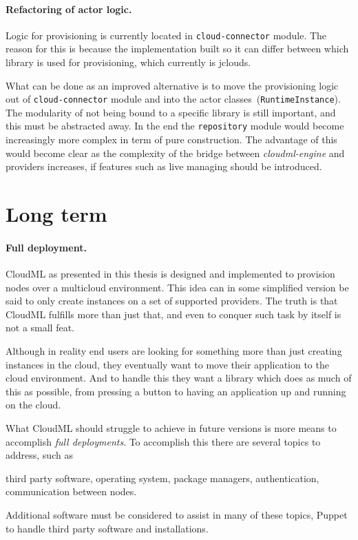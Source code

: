 \paragraph{Refactoring of actor logic.}

Logic for provisioning is currently located in \texttt{cloud-connector} module.
The reason for this is because the implementation built so it can differ between which library is used for provisioning, 
which currently is jclouds.

What can be done as an improved alternative is to move the provisioning logic out of \texttt{cloud-connector} 
module and into the actor classes~(\texttt{RuntimeInstance}).
The modularity of not being bound to a specific library is still important, and this must be abstracted away.
In the end the \texttt{repository} module would become increasingly more complex in term of pure construction.
The advantage of this would become clear as the complexity of the bridge between \emph{cloudml-engine}
and providers increases, \eg if features such as live managing should be introduced.

\section{Long term}

\paragraph{Full deployment.}

CloudML as presented in this thesis is designed and implemented to provision nodes over a multicloud environment.
This idea can in some simplified version be said to only create instances on a set of supported providers.
The truth is that CloudML fulfills more than just that, and even to conquer such task by itself is not a small feat.

Although in reality end users are looking for something more than just creating instances in the cloud,
they eventually want to move their application to the cloud environment.
And to handle this they want a library which does as much of this as possible,
from pressing a button to having an application up and running on the cloud.

What CloudML should struggle to achieve in future versions is more means to accomplish \emph{full deployments}.
To accomplish this there are several topics to address, such as
\begin{ii}
  \iitem third party software,
  \iitem operating system,
  \iitem package managers,
  \iitem authentication,
  \iitem communication between nodes.
\end{ii}
Additional software must be considered to assist in many of these topics,
\eg Puppet to handle third party software and installations.
\\

